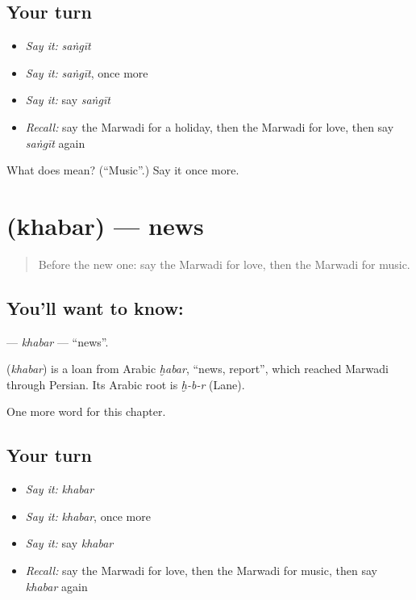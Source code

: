 \subsection*{Your turn}
\begin{itemize}
\raggedright
  \item \emph{Say it:} \emph{saṅgīt}
  \item \emph{Say it:} \emph{saṅgīt}, once more
  \item \emph{Say it:} say \emph{saṅgīt}
  \item \emph{Recall:} say the Marwadi for a holiday, then the Marwadi for love, then say \emph{saṅgīt} again
\end{itemize}

\begin{tcolorbox}[breakable,colback=teal!4,colframe=teal!35!black,title={Before you move on}]
What does  mean? (\textquotedblleft{}Music\textquotedblright{}.) Say it once more.
\end{tcolorbox}
\section[\texorpdfstring{\mw{खबर} (khabar)}{खबर (khabar)}]{ (khabar) — news}

\label{lesson:MW-C89-khabar}



\begin{quote}
Before the new one: say the Marwadi for love, then the Marwadi for music.
\end{quote}

\subsection*{You'll want to know: }
\textbf{} — \emph{khabar} — \textquotedblleft{}news\textquotedblright{}.

\begin{cousinweb}
\textbf{} (\emph{khabar}) is a loan from Arabic \emph{ḫabar}, \textquotedblleft{}news, report\textquotedblright{}, which reached Marwadi through Persian. Its Arabic root is \emph{ḫ-b-r} (Lane).
\end{cousinweb}

\begin{grammarlens}[title={What you've built}]
One more word for this chapter.
\end{grammarlens}

\subsection*{Your turn}
\begin{itemize}
\raggedright
  \item \emph{Say it:} \emph{khabar}
  \item \emph{Say it:} \emph{khabar}, once more
  \item \emph{Say it:} say \emph{khabar}
  \item \emph{Recall:} say the Marwadi for love, then the Marwadi for music, then say \emph{khabar} again
\end{itemize}

